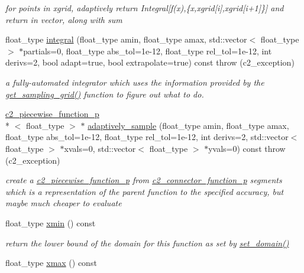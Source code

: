 \begin{DoxyCompactItemize}
\begin{DoxyCompactList}\small\item\em for points in xgrid, adaptively return Integral\mbox{[}f(x),\{x,xgrid\mbox{[}i\mbox{]},xgrid\mbox{[}i+1\mbox{]}\}\mbox{]} and return in vector, along with sum \end{DoxyCompactList}\item 
float\-\_\-type \hyperlink{classc2__function_a675c5056562332be2e49b38485d322b7}{integral} (float\-\_\-type amin, float\-\_\-type amax, std\-::vector$<$ float\-\_\-type $>$ $\ast$partials=0, float\-\_\-type abs\-\_\-tol=1e-\/12, float\-\_\-type rel\-\_\-tol=1e-\/12, int derivs=2, bool adapt=true, bool extrapolate=true) const   throw (c2\-\_\-exception)
\begin{DoxyCompactList}\small\item\em a fully-\/automated integrator which uses the information provided by the \hyperlink{classc2__function_ad03264dcc015e5d0b1b6eb30df3f32be}{get\-\_\-sampling\-\_\-grid()} function to figure out what to do. \end{DoxyCompactList}\item 
\hyperlink{classc2__piecewise__function__p}{c2\-\_\-piecewise\-\_\-function\-\_\-p}\\*
$<$ float\-\_\-type $>$ $\ast$ \hyperlink{classc2__function_aea75f73d6a97087571c163ae4e514652}{adaptively\-\_\-sample} (float\-\_\-type amin, float\-\_\-type amax, float\-\_\-type abs\-\_\-tol=1e-\/12, float\-\_\-type rel\-\_\-tol=1e-\/12, int derivs=2, std\-::vector$<$ float\-\_\-type $>$ $\ast$xvals=0, std\-::vector$<$ float\-\_\-type $>$ $\ast$yvals=0) const   throw (c2\-\_\-exception)
\begin{DoxyCompactList}\small\item\em create a \hyperlink{classc2__piecewise__function__p}{c2\-\_\-piecewise\-\_\-function\-\_\-p} from \hyperlink{classc2__connector__function__p}{c2\-\_\-connector\-\_\-function\-\_\-p} segments which is a representation of the parent function to the specified accuracy, but maybe much cheaper to evaluate \end{DoxyCompactList}\item 
\hypertarget{classc2__function_acddff2d033c7f3205658e246d806204b}{float\-\_\-type \hyperlink{classc2__function_acddff2d033c7f3205658e246d806204b}{xmin} () const }\label{classc2__function_acddff2d033c7f3205658e246d806204b}

\begin{DoxyCompactList}\small\item\em return the lower bound of the domain for this function as set by \hyperlink{classc2__function_adeb70da9c75011e9abd71142dca4c22e}{set\-\_\-domain()} \end{DoxyCompactList}\item 
\hypertarget{classc2__function_a7f3ac790b6659b2d137f4c90eadb6ef0}{float\-\_\-type \hyperlink{classc2__function_a7f3ac790b6659b2d137f4c90eadb6ef0}{xmax} () const }\label{classc2__function_a7f3ac790b6659b2d137f4c90eadb6ef0}


\end{DoxyCompactItemize}

